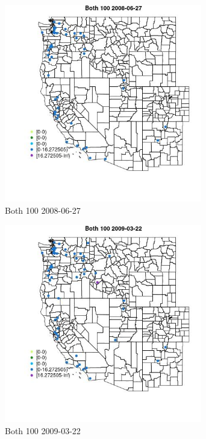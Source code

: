 \begin{figure} 
\centering  
\includegraphics[width=0.77\textwidth]{Code_Outputs/Report_ML_input_PM25_Step4_part_e_de_duplicated_aves_MapObsBoth_1002008-06-27.jpg} 
\caption{\label{fig:Report_ML_input_PM25_Step4_part_e_de_duplicated_avesMapObsBoth_1002008-06-27}Both 100 2008-06-27} 
\end{figure} 
 

\begin{figure} 
\centering  
\includegraphics[width=0.77\textwidth]{Code_Outputs/Report_ML_input_PM25_Step4_part_e_de_duplicated_aves_MapObsBoth_1002009-03-22.jpg} 
\caption{\label{fig:Report_ML_input_PM25_Step4_part_e_de_duplicated_avesMapObsBoth_1002009-03-22}Both 100 2009-03-22} 
\end{figure} 
 

